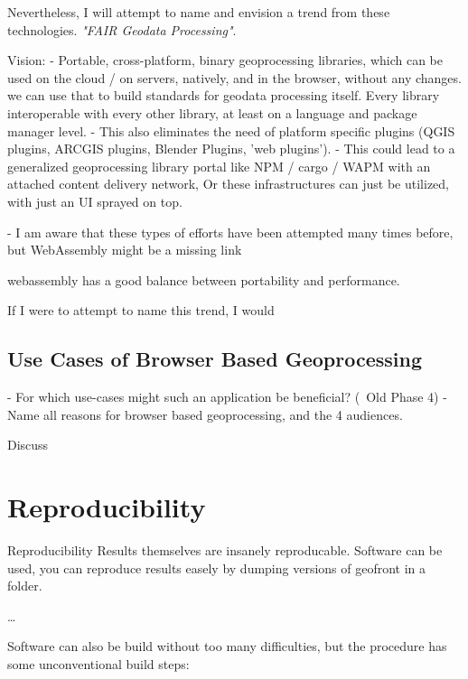Nevertheless, I will attempt to name and envision a trend from these technologies. \emph{"FAIR Geodata Processing"}.

Vision: 
- Portable, cross-platform, binary geoprocessing libraries, which can be used on the cloud / on servers, natively, and in the browser, without any changes. 
\m{->} we can use that to build standards for geodata processing itself. Every  library interoperable with every other library, at least on a language and package manager level.
- This also eliminates the need of platform specific plugins (QGIS plugins, ARCGIS plugins, Blender Plugins, 'web plugins').
- This could lead to a generalized geoprocessing library portal like NPM / cargo / WAPM with an attached content delivery network, Or these infrastructures can just be utilized, with just an UI sprayed on top.

- I am aware that these types of efforts have been attempted many times before, but WebAssembly might be a missing link 

\m{->} webassembly has a good balance between portability and performance.

\m{->}

If I were to attempt to name this trend, I would









\subsection{Use Cases of Browser Based Geoprocessing}



- For which use-cases might such an application be beneficial? (~Old Phase 4)
- Name all reasons for browser based geoprocessing, and the 4 audiences.

Discuss 

\section{Reproducibility}

Reproducibility
Results themselves are insanely reproducable.
Software can be used, you can reproduce results easely by dumping versions of geofront in 
a folder.

\dots

Software can also be build without too many difficulties, but the procedure has some unconventional build steps: 

